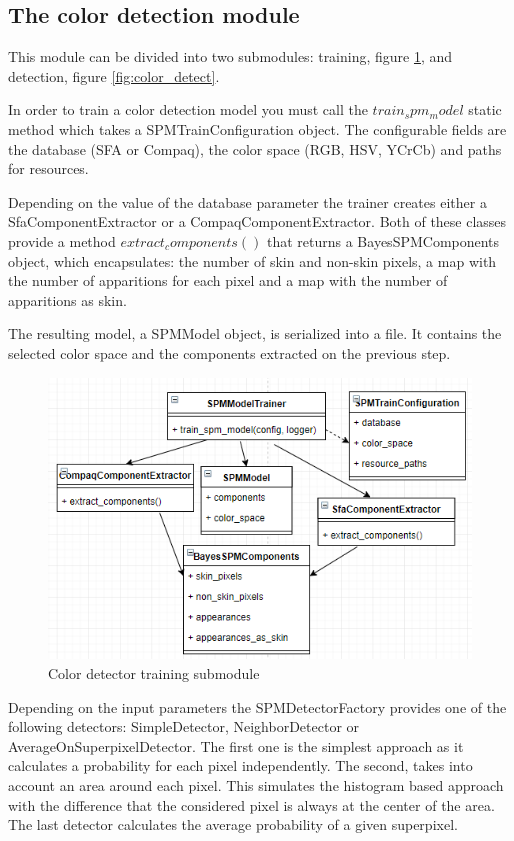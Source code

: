 \documentclass[12pt]{report}
\begin{document}
	\subsection{The color detection module}
	This module can be divided into two submodules: training, figure \ref{fig:color_train}, and detection, figure \ref{fig:color_detect}.
	
	In order to train a color detection model you must call the $train_spm_model$ static method which takes a SPMTrainConfiguration object. The configurable fields are the database (SFA or Compaq), the color space (RGB, HSV, YCrCb) and paths for resources. 
	
	Depending on the value of the database parameter the trainer creates either a SfaComponentExtractor or a CompaqComponentExtractor. Both of these classes provide a method $extract_components()$ that returns a BayesSPMComponents object, which encapsulates: the number of skin and non-skin pixels, a map with the number of apparitions for each pixel and a map with the number of apparitions as skin.
	
	The resulting model, a SPMModel object, is serialized into a file. It contains the selected color space and the components extracted on the previous step.
	
	\begin{figure}[h!]
		\centering
		\includegraphics[]{design/color_train.png}
		\caption{Color detector training submodule}
		\label{fig:color_train}
	\end{figure}
	
	Depending on the input parameters the SPMDetectorFactory provides one of the following detectors: SimpleDetector, NeighborDetector or AverageOnSuperpixelDetector. The first one is the simplest approach as it calculates a probability for each pixel independently. The second, takes into account an area around each pixel. This simulates the histogram based approach with the difference that the considered pixel is always at the center of the area. The last detector calculates the average probability of a given superpixel.
	
\end{document}
